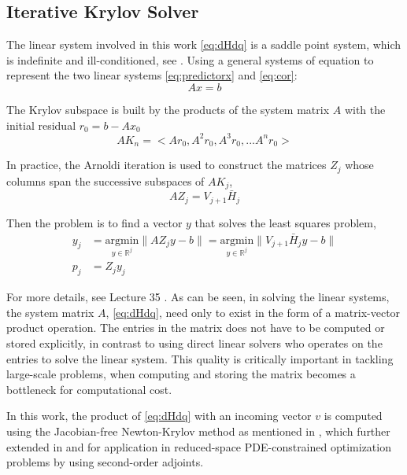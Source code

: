 \documentclass{article}
\theoremstyle{definition}
\begin{document}
\subsection{Iterative Krylov Solver}
The linear system involved in this work \eqref{eq:dHdq} is a saddle point system, which is indefinite and ill-conditioned, see \cite{benzi2005numerical,saddle_opt}. Using a general systems of equation to represent the two linear systems \eqref{eq:predictorx} and \eqref{eq:cor}:
\begin{equation}
Ax = b 
\end{equation}

The Krylov subspace is built by the products of the system matrix $A$ with the initial residual $r_0 = b - A x_0$
\begin{equation}
AK_n = <Ar_0, A^2r_0, A^3r_0, ... A^nr_0> 
\end{equation}

In practice, the Arnoldi iteration is used to construct the matrices $Z_j$ whose columns span the successive subspaces of $AK_j$, 
\begin{equation}
AZ_j = V_{j+1} \bar{H}_j
\end{equation}

Then the problem is to find a vector $y$ that solves the least squares problem, 
\begin{equation}
\begin{aligned}
y_j &= \underset{y \in \mathbb{R}^j}{\textrm{argmin}}\lVert A Z_j y - b \rVert = \underset{y \in \mathbb{R}^j}{\textrm{argmin}}\lVert  V_{j+1} \bar{H}_j y - b \rVert \\
p_j &= Z_j y_j
\end{aligned}
\end{equation}

For more details, see Lecture 35 \cite{trefethen1997numerical}. As can be seen, in solving the linear systems, the system matrix $A$, \eqref{eq:dHdq}, need only to exist in the form of a matrix-vector product operation. The entries in the matrix does not have to be computed or stored explicitly, in contrast to using direct linear solvers who operates on the entries to solve the linear system. This quality is critically important in tackling large-scale problems, when computing and storing the matrix becomes a bottleneck for computational cost. 

In this work, the product of \eqref{eq:dHdq} with an incoming vector $v$ is computed using the Jacobian-free Newton-Krylov method as mentioned in \cite{Knoll:2004:JNM:973444.973445}, which further extended in \cite{hicken:inexact2014} and \cite{dener:idf2017} for application in reduced-space PDE-constrained optimization problems by using second-order adjoints. 
\end{document}
